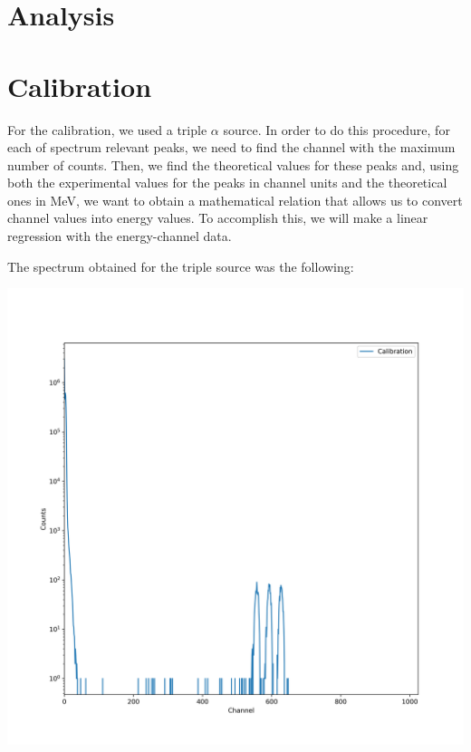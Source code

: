 \documentclass{article}
\begin{document}
\begin{multicols}{2}
\section*{Analysis}

\section{Calibration}
    \label{sec:calibration}

For the calibration, we used a triple $\alpha$ source.
In order to do this procedure, for each of spectrum relevant peaks, we need to find the channel with the maximum number of counts.
Then, we find the theoretical values for these peaks and, using both the experimental values for the peaks in channel units and the theoretical ones in MeV, we want to obtain a mathematical relation that allows us to convert channel values into energy values.
To accomplish this, we will make a linear regression with the energy-channel data.

The spectrum obtained for the triple source was the following:

\begin{center}
    \label{TT_21}
    \centering
    \includegraphics[scale = 0.3]{../../images/Calib.png}
\end{center}


\end{multicols}
\end{document}
